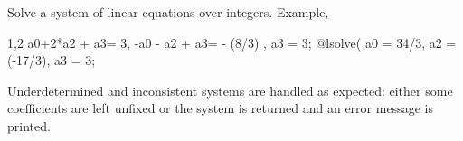 
Solve a system of linear equations over integers. Example,
\begin{screen}{1,2}
{ a0+2*a2 + a3= 3, -a0 - a2 + a3= - (8/3) , a3 = 3};
@lsolve(%
{a0 = 34/3, a2 = (-17/3), a3 = 3};
\end{screen}
Underdetermined and inconsistent systems are handled as expected:
either some coefficients are left unfixed or the system is returned
and an error message is printed.

